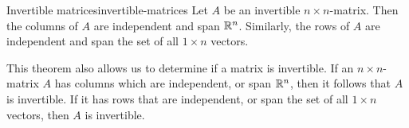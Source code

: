 \begin{theorem}{Invertible matrices}{invertible-matrices}
  Let $A$ be an invertible $n \times n$-matrix. Then the columns of
  $A$ are independent and span $\mathbb{R}^n$. Similarly, the rows of $A$ are
  independent and span the set of all $1 \times n$ vectors.
\end{theorem}

This theorem also allows us to determine if a matrix is invertible. If
an $n \times n$-matrix $A$ has columns which are independent, or span
$\mathbb{R}^n$, then it follows that $A$ is invertible. If it has rows that
are independent, or span the set of all $1 \times n$ vectors, then $A$
is invertible.
